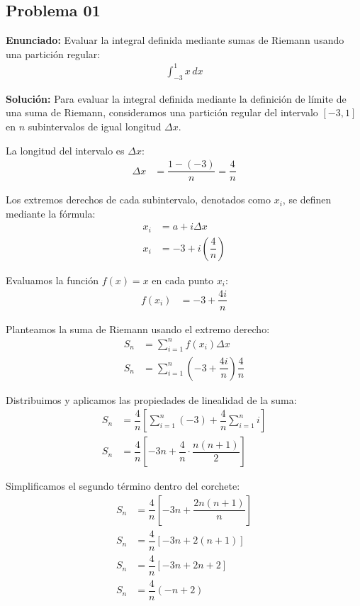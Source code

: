 \subsection*{Problema 01}

\textbf{Enunciado:} Evaluar la integral definida mediante sumas de Riemann usando una partición regular:
\begin{align*}
\int_{-3}^{1} x \, dx
\end{align*}

\textbf{Solución:} Para evaluar la integral definida mediante la definición de límite de una suma de Riemann, consideramos una partición regular del intervalo $[-3, 1]$ en $n$ subintervalos de igual longitud $\Delta x$.

La longitud del intervalo es $\Delta x$:
\begin{align*}
\Delta x &= \dfrac{1 - (-3)}{n} = \dfrac{4}{n}
\end{align*}

Los extremos derechos de cada subintervalo, denotados como $x_i$, se definen mediante la fórmula:
\begin{align*}
x_i &= a + i\Delta x \\
x_i &= -3 + i\left(\dfrac{4}{n}\right)
\end{align*}

Evaluamos la función $f(x) = x$ en cada punto $x_i$:
\begin{align*}
f(x_i) &= -3 + \dfrac{4i}{n}
\end{align*}

Planteamos la suma de Riemann usando el extremo derecho:
\begin{align*}
S_n &= \sum_{i=1}^{n} f(x_i) \Delta x \\
S_n &= \sum_{i=1}^{n} \left( -3 + \dfrac{4i}{n} \right) \dfrac{4}{n}
\end{align*}

Distribuimos y aplicamos las propiedades de linealidad de la suma:
\begin{align*}
S_n &= \dfrac{4}{n} \left[ \sum_{i=1}^{n} (-3) + \dfrac{4}{n} \sum_{i=1}^{n} i \right] \\
S_n &= \dfrac{4}{n} \left[ -3n + \dfrac{4}{n} \cdot \dfrac{n(n+1)}{2} \right]
\end{align*}

Simplificamos el segundo término dentro del corchete:
\begin{align*}
S_n &= \dfrac{4}{n} \left[ -3n + \dfrac{2n(n+1)}{n} \right] \\
S_n &= \dfrac{4}{n} [ -3n + 2(n+1) ] \\
S_n &= \dfrac{4}{n} [ -3n + 2n + 2 ] \\
S_n &= \dfrac{4}{n} ( -n + 2 )
\end{align*}

